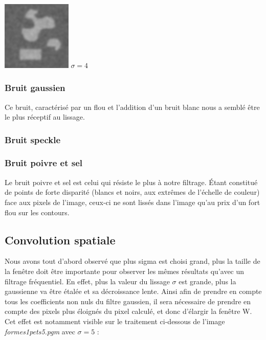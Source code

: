 \documentclass[a4,12pt]{article}
\begin{document}
\begin{minipage}[c]{0.20\linewidth}
	\begin{center}
		\includegraphics[width = 33mm]{./img/2bb50-4.jpg}
		\textit{$\sigma = 4$}
	\end{center}
\end{minipage}

\subsubsection*{Bruit gaussien}
Ce bruit, caractérisé par un flou et l'addition d'un bruit blanc nous a semblé être le plus réceptif au lissage. 
\subsubsection*{Bruit speckle}

\subsubsection*{Bruit poivre et sel}
Le bruit poivre et sel est celui qui résiste le plus à notre filtrage. Étant constitué de points de forte disparité (blancs et noirs, aux extrêmes de l'échelle de couleur) face aux pixels de l'image, ceux-ci ne sont lissés dans l'image qu'au prix d'un fort flou sur les contours.

\subsection{Convolution spatiale}

Nous avons tout d'abord observé que plus sigma est choisi grand, plus la taille de la fenêtre doit être importante pour observer les mêmes résultats qu'avec un filtrage fréquentiel. En effet, plus la valeur du lissage $\sigma$ est grande, plus la gaussienne va être étalée et sa décroissance lente. Ainsi afin de prendre en compte tous les coefficients non nuls du filtre gaussien, il sera nécessaire de prendre en compte des pixels plus éloignés du pixel calculé, et donc d'élargir la fenêtre W.\\

Cet effet est notamment visible sur le traitement ci-dessous de l'image \textit{formes1pets5.pgm} avec $\sigma = 5$ :\\
\end{document}
